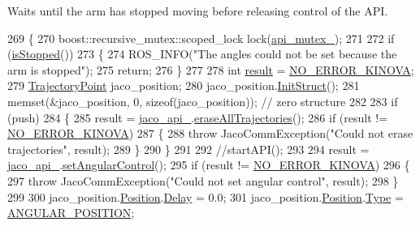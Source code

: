 Waits until the arm has stopped moving before releasing control of the A\+PI. 
\begin{DoxyCode}
269 \{
270     boost::recursive\_mutex::scoped\_lock lock(\hyperlink{classjaco_1_1JacoComm_ac6ef2a6b3c51877fc4237d834c35908a}{api\_mutex\_});
271 
272     \textcolor{keywordflow}{if} (\hyperlink{classjaco_1_1JacoComm_a872b8033cda5a9fe4ccdca2e89aa03d1}{isStopped}())
273     \{
274         ROS\_INFO(\textcolor{stringliteral}{"The angles could not be set because the arm is stopped"});
275         \textcolor{keywordflow}{return};
276     \}
277 
278     \textcolor{keywordtype}{int} \hyperlink{Kinova_8API_8CommLayerUbuntu_8h_a900dac90961bada00f57c207562a6a9a}{result} = \hyperlink{Kinova_8API_8CommLayerUbuntu_8h_a510f2320a2a31d2d225adc0da7bef595}{NO\_ERROR\_KINOVA};
279     \hyperlink{structTrajectoryPoint}{TrajectoryPoint} jaco\_position;
280     jaco\_position.\hyperlink{structTrajectoryPoint_a1a9f12ad88f5011c6a4644792fa67f99}{InitStruct}();
281     memset(&jaco\_position, 0, \textcolor{keyword}{sizeof}(jaco\_position));  \textcolor{comment}{// zero structure}
282 
283     \textcolor{keywordflow}{if} (push)
284     \{
285         result = \hyperlink{classjaco_1_1JacoComm_a8d1510c941f28a4e8f921691d4fd2248}{jaco\_api\_}.\hyperlink{classjaco_1_1JacoAPI_a97db09d91923328b1780bb50a0e2548d}{eraseAllTrajectories}();
286         \textcolor{keywordflow}{if} (result != \hyperlink{Kinova_8API_8CommLayerUbuntu_8h_a510f2320a2a31d2d225adc0da7bef595}{NO\_ERROR\_KINOVA})
287         \{
288             \textcolor{keywordflow}{throw} JacoCommException(\textcolor{stringliteral}{"Could not erase trajectories"}, result);
289         \}
290     \}
291 
292     \textcolor{comment}{//startAPI();}
293 
294     result = \hyperlink{classjaco_1_1JacoComm_a8d1510c941f28a4e8f921691d4fd2248}{jaco\_api\_}.\hyperlink{classjaco_1_1JacoAPI_a4ce9340d50866cf102722ad6c370bdfd}{setAngularControl}();
295     \textcolor{keywordflow}{if} (result != \hyperlink{Kinova_8API_8CommLayerUbuntu_8h_a510f2320a2a31d2d225adc0da7bef595}{NO\_ERROR\_KINOVA})
296     \{
297         \textcolor{keywordflow}{throw} JacoCommException(\textcolor{stringliteral}{"Could not set angular control"}, result);
298     \}
299 
300     jaco\_position.\hyperlink{structTrajectoryPoint_aa24430dc273e9d7968a6c44e3bcee259}{Position}.\hyperlink{structUserPosition_aa18896c1238a50c8ad81c66dfd76ac5e}{Delay} = 0.0;
301     jaco\_position.\hyperlink{structTrajectoryPoint_aa24430dc273e9d7968a6c44e3bcee259}{Position}.\hyperlink{structUserPosition_a93c748d4ee51239fcbcd487d88e52ffa}{Type} = \hyperlink{KinovaTypes_8h_a0a1c22d235ef1b13cfcd1419d10babc9acec3b882918c5c90a239fd07290d6031}{ANGULAR\_POSITION};

\end{DoxyCode}
